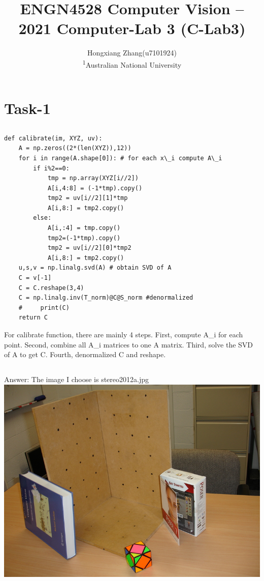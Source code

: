 \documentclass[]{article}
\newcommand*{\affaddr}[1]{#1}
\newcommand*{\affmark}[1][*]{\textsuperscript{#1}}
\begin{document}
\title{ENGN4528 Computer Vision – 2021 Computer-Lab 3 (C-Lab3)}

\author{Hongxiang Zhang(u7101924)\\
	\affaddr{\affmark[1]Australian National University}
}


\maketitle

\section{Task-1}
\subsection{}
\begin{lstlisting}
def calibrate(im, XYZ, uv):
	A = np.zeros((2*(len(XYZ)),12))
	for i in range(A.shape[0]): # for each x\_i compute A\_i
		if i%2==0: 
			tmp = np.array(XYZ[i//2])
			A[i,4:8] = (-1*tmp).copy()
			tmp2 = uv[i//2][1]*tmp
			A[i,8:] = tmp2.copy()
		else:
			A[i,:4] = tmp.copy()
			tmp2=(-1*tmp).copy()
			tmp2 = uv[i//2][0]*tmp2
			A[i,8:] = tmp2.copy()
	u,s,v = np.linalg.svd(A) # obtain SVD of A
	C = v[-1]
	C = C.reshape(3,4)
	C = np.linalg.inv(T_norm)@C@S_norm #denormalized
	#     print(C)
	return C
\end{lstlisting}
For calibrate function, there are mainly 4 steps. First, compute A\_i for each point. Second, combine all A\_i matrices to one A matrix. Third, solve the SVD of A to get C. Fourth, denormalized C and reshape.

\subsection{}
Answer: The image I choose is stereo2012a.jpg\\
\includegraphics[width=\textwidth]{before.jpg}
\end{document}
